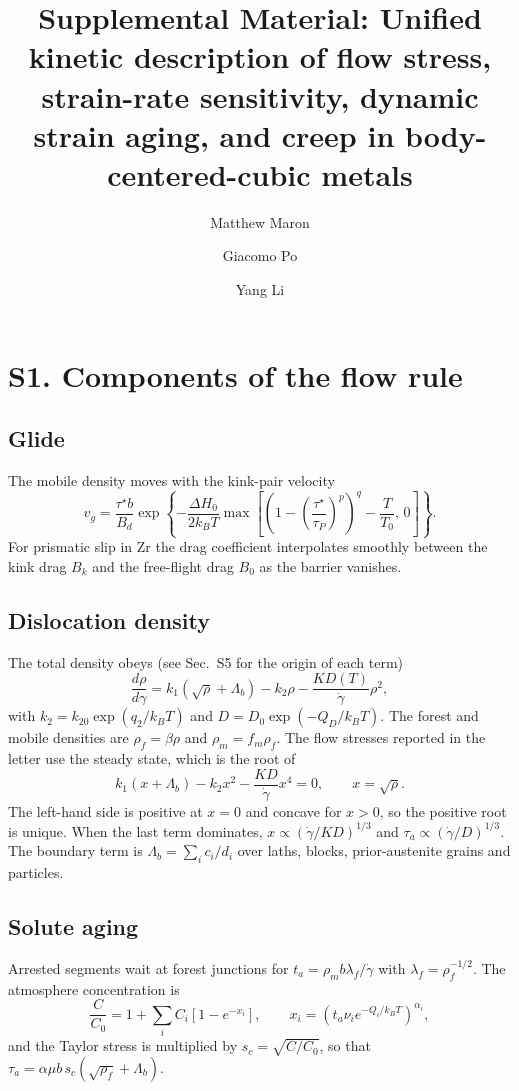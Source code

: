 \documentclass[aps,prl,onecolumn,superscriptaddress,amsmath,amssymb,floatfix]{revtex4-2}
\newcommand{\gd}{\dot\gamma}
\newcommand{\ts}{\tau^{\star}}
\newcommand{\kT}{k_BT}
\begin{document}
\title{Supplemental Material: Unified kinetic description of flow stress, strain-rate sensitivity, dynamic strain aging, and creep in body-centered-cubic metals}
\author{Matthew Maron}
\author{Giacomo Po}
\author{Yang Li}
\maketitle

\section{S1. Components of the flow rule}

\subsection{Glide}
The mobile density moves with the kink-pair velocity
\begin{equation}
v_g=\frac{\ts b}{B_d}\exp\left\{-\frac{\Delta H_0}{2\kT}\max\left[\left(1-\left(\frac{\ts}{\tau_P}\right)^p\right)^q-\frac{T}{T_0},\,0\right]\right\}.
\end{equation}
For prismatic slip in Zr the drag coefficient interpolates smoothly between the kink drag $B_k$ and the free-flight drag $B_0$ as the barrier vanishes.

\subsection{Dislocation density}
The total density obeys (see Sec.~S5 for the origin of each term)
\begin{equation}
\frac{d\rho}{d\gamma}=k_1(\sqrt\rho+\Lambda_b)-k_2\rho-\frac{K D(T)}{\gd}\rho^2,
\end{equation}
with $k_2=k_{20}\exp(q_2/\kT)$ and $D=D_0\exp(-Q_D/\kT)$. The forest and mobile densities are $\rho_f=\beta\rho$ and $\rho_m=f_m\rho_f$. The flow stresses reported in the letter use the steady state, which is the root of
\begin{equation}
k_1(x+\Lambda_b)-k_2x^2-\frac{K D}{\gd}x^4=0,\qquad x=\sqrt\rho .
\end{equation}
The left-hand side is positive at $x=0$ and concave for $x>0$, so the positive root is unique. When the last term dominates, $x\propto(\gd/KD)^{1/3}$ and $\tau_a\propto(\gd/D)^{1/3}$. The boundary term is $\Lambda_b=\sum_ic_i/d_i$ over laths, blocks, prior-austenite grains and particles.

\subsection{Solute aging}
Arrested segments wait at forest junctions for $t_a=\rho_mb\lambda_f/\gd$ with $\lambda_f=\rho_f^{-1/2}$. The atmosphere concentration is
\begin{equation}
\frac{C}{C_0}=1+\sum_iC_i\left[1-e^{-x_i}\right],\qquad x_i=\left(t_a\nu_ie^{-Q_i/\kT}\right)^{\alpha_i},
\end{equation}
and the Taylor stress is multiplied by $s_c=\sqrt{C/C_0}$, so that $\tau_a=\alpha\mu b\,s_c(\sqrt{\rho_f}+\Lambda_b)$.
\end{document}
